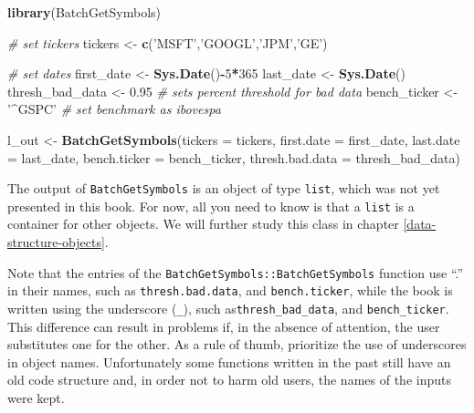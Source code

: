 \documentclass[
  12pt,
]{book}
\newenvironment{Shaded}{\begin{snugshade}}{\end{snugshade}}
\newcommand{\CommentTok}[1]{\textcolor[rgb]{0.37,0.37,0.37}{\textit{#1}}}
\newcommand{\DataTypeTok}[1]{\textcolor[rgb]{0.27,0.27,0.27}{#1}}
\newcommand{\DecValTok}[1]{\textcolor[rgb]{0.06,0.06,0.06}{#1}}
\newcommand{\FloatTok}[1]{\textcolor[rgb]{0.06,0.06,0.06}{#1}}
\newcommand{\KeywordTok}[1]{\textcolor[rgb]{0.27,0.27,0.27}{\textbf{#1}}}
\newcommand{\NormalTok}[1]{#1}
\newcommand{\OperatorTok}[1]{\textcolor[rgb]{0.43,0.43,0.43}{\textbf{#1}}}
\newcommand{\StringTok}[1]{\textcolor[rgb]{0.5,0.5,0.5}{#1}}
\newenvironment{rmdcaution}
{\begin{cautionblock}
		
	} {\end{cautionblock}}
\begin{document}
\begin{Shaded}
\begin{Highlighting}[]
\KeywordTok{library}\NormalTok{(BatchGetSymbols)}

\CommentTok{# set tickers}
\NormalTok{tickers <-}\StringTok{ }\KeywordTok{c}\NormalTok{(}\StringTok{'MSFT'}\NormalTok{,}\StringTok{'GOOGL'}\NormalTok{,}\StringTok{'JPM'}\NormalTok{,}\StringTok{'GE'}\NormalTok{)}

\CommentTok{# set dates}
\NormalTok{first_date <-}\StringTok{ }\KeywordTok{Sys.Date}\NormalTok{()}\OperatorTok{-}\DecValTok{5}\OperatorTok{*}\DecValTok{365}
\NormalTok{last_date <-}\StringTok{ }\KeywordTok{Sys.Date}\NormalTok{()}
\NormalTok{thresh_bad_data <-}\StringTok{ }\FloatTok{0.95}   \CommentTok{# sets percent threshold for bad data}
\NormalTok{bench_ticker <-}\StringTok{ '^GSPC'}   \CommentTok{# set benchmark as ibovespa}

\NormalTok{l_out <-}\StringTok{ }\KeywordTok{BatchGetSymbols}\NormalTok{(}\DataTypeTok{tickers =}\NormalTok{ tickers,}
                         \DataTypeTok{first.date =}\NormalTok{ first_date,}
                         \DataTypeTok{last.date =}\NormalTok{ last_date,}
                         \DataTypeTok{bench.ticker =}\NormalTok{ bench_ticker,}
                         \DataTypeTok{thresh.bad.data =}\NormalTok{ thresh_bad_data)}
\end{Highlighting}
\end{Shaded}

The output of \texttt{BatchGetSymbols} is an object of type \texttt{list}, which was not yet presented in this book. For now, all you need to know is that a \texttt{list} is a container for other objects. We will further study this class in chapter \ref{data-structure-objects}.

\begin{rmdcaution}
Note that the entries of the \texttt{BatchGetSymbols::BatchGetSymbols}
function use ``.'' in their names, such as \texttt{thresh.bad.data}, and
\texttt{bench.ticker}, while the book is written using the underscore
(\texttt{\_}), such as\texttt{thresh\_bad\_data}, and
\texttt{bench\_ticker}. This difference can result in problems if, in
the absence of attention, the user substitutes one for the other. As a
rule of thumb, prioritize the use of underscores in object names.
Unfortunately some functions written in the past still have an old code
structure and, in order not to harm old users, the names of the inputs
were kept.
\end{rmdcaution}
\end{document}
